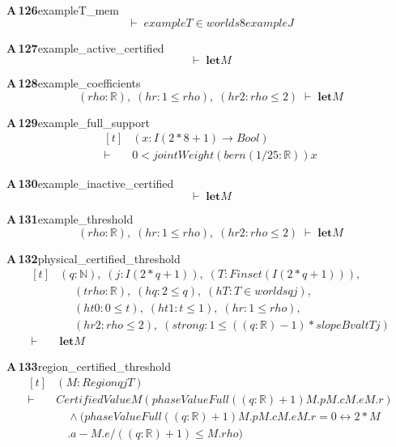 \documentclass[conference]{IEEEtran}
\theoremstyle{definition}
\newcommand{\lean}[1]{\textsf{\footnotesize #1}}
\begin{document}
\noindent\textbf{A\,126}\quad\lean{exampleT\_mem}
{\footnotesize\[ \vdash\; \mathit{exampleT} \in \mathit{worlds} 8 \mathit{exampleJ} \]}

\noindent\textbf{A\,127}\quad\lean{example\_active\_certified}
{\footnotesize\[ \vdash\; \mathbf{let} \mathit{M} \]}

\noindent\textbf{A\,128}\quad\lean{example\_coefficients}
{\footnotesize\[ (\mathit{rho} : \mathbb{R} ),\; (\mathit{hr} : 1 \leq \mathit{rho}),\; (\mathit{hr2} : \mathit{rho} \leq 2) \;\vdash\; \mathbf{let} \mathit{M} \]}

\noindent\textbf{A\,129}\quad\lean{example\_full\_support}
{\footnotesize\[ \begin{aligned}[t]
&(\mathit{x} : \mathit{I} (2*8+1) \to \mathit{Bool})\\
\vdash\;&0 < \mathit{jointWeight} (\mathit{bern} (1/25 : \mathbb{R} )) \mathit{x}
\end{aligned} \]}

\noindent\textbf{A\,130}\quad\lean{example\_inactive\_certified}
{\footnotesize\[ \vdash\; \mathbf{let} \mathit{M} \]}

\noindent\textbf{A\,131}\quad\lean{example\_threshold}
{\footnotesize\[ (\mathit{rho} : \mathbb{R} ),\; (\mathit{hr} : 1 \leq \mathit{rho}),\; (\mathit{hr2} : \mathit{rho} \leq 2) \;\vdash\; \mathbf{let} \mathit{M} \]}

\noindent\textbf{A\,132}\quad\lean{physical\_certified\_threshold}
{\footnotesize\[ \begin{aligned}[t]
&(\mathit{q} : \mathbb{N} ),\; (\mathit{j} : \mathit{I} (2*\mathit{q}+1)),\; (\mathit{T} : \mathit{Finset} (\mathit{I} (2*\mathit{q}+1))),\\
&\quad \; (\mathit{t} \mathit{rho} : \mathbb{R} ),\; (\mathit{hq} : 2 \leq \mathit{q}),\; (\mathit{hT} : \mathit{T} \in \mathit{worlds} \mathit{q} \mathit{j}),\\
&\quad \; (\mathit{ht0} : 0 \leq \mathit{t}),\; (\mathit{ht1} : \mathit{t} \leq 1),\; (\mathit{hr} : 1 \leq \mathit{rho}),\\
&\quad \; (\mathit{hr2} : \mathit{rho} \leq 2),\; (\mathit{strong} : 1 \leq ((\mathit{q}:\mathbb{R} )-1)*\mathit{slopeBval} \mathit{t} \mathit{T} \mathit{j})\\
\vdash\;&\mathbf{let} \mathit{M}
\end{aligned} \]}

\noindent\textbf{A\,133}\quad\lean{region\_certified\_threshold}
{\footnotesize\[ \begin{aligned}[t]
&(\mathit{M} : \mathit{Region} \mathit{q} \mathit{j} \mathit{T})\\
\vdash\;&\mathit{CertifiedValue} \mathit{M} (\mathit{phaseValueFull} ((\mathit{q}:\mathbb{R} )+1) \mathit{M}.\mathit{p} \mathit{M}.\mathit{c} \mathit{M}.\mathit{e} \mathit{M}.\mathit{r})\\
&\quad \wedge (\mathit{phaseValueFull} ((\mathit{q}:\mathbb{R} )+1) \mathit{M}.\mathit{p} \mathit{M}.\mathit{c} \mathit{M}.\mathit{e} \mathit{M}.\mathit{r} = 0 \leftrightarrow 2*\mathit{M}\\
&\quad .\mathit{a}-\mathit{M}.\mathit{e}/((\mathit{q}:\mathbb{R} )+1) \leq \mathit{M}.\mathit{rho})
\end{aligned} \]}
\end{document}
